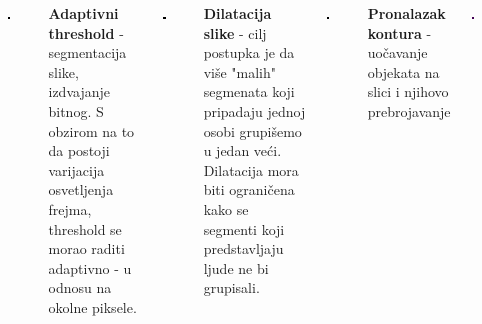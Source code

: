 \documentclass[24pt, a0paper, portrait]{tikzposter}
\begin{document}
\begin{columns}
{\begin{center}
	\end{center}
            \begin{tikzfigure}
                \includegraphics[width=0.12\textwidth]{assets/ljudi-razlika-blur.png}
            \end{tikzfigure}

	\begin{center}
	 \textbf{Adaptivni threshold} -  segmentacija slike, izdvajanje bitnog. S obzirom na to da postoji varijacija osvetljenja frejma, threshold se morao raditi adaptivno - u odnosu na okolne piksele.
	
	\end{center}
            \begin{tikzfigure}
                \includegraphics[width=0.12\textwidth]{assets/ljudi-threshold.png}
            \end{tikzfigure}

	\begin{center}
	 \textbf{Dilatacija slike} - cilj postupka je da više "malih" segmenata koji pripadaju jednoj osobi grupišemo u jedan veći. Dilatacija mora biti ograničena kako se segmenti koji predstavljaju ljude ne bi grupisali.
	
	\end{center}
            \begin{tikzfigure}
                \includegraphics[width=0.12\textwidth]{assets/ljudi-dilated.png}
            \end{tikzfigure}

	\begin{center}
	 \textbf{Pronalazak kontura} - uočavanje objekata na slici i njihovo prebrojavanje
	
	\end{center}
            \begin{tikzfigure}
                \includegraphics[width=0.12\textwidth]{assets/ljudi-konture.png}
            \end{tikzfigure}
}
\end{columns}

\begin{columns}

	

	


\end{columns}
\end{document}
